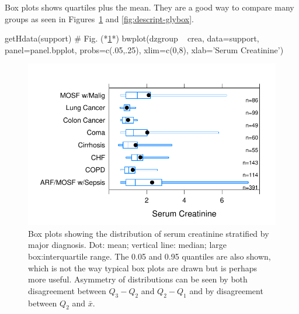 \item Box plots shows quartiles plus the mean.  They are a good way to
  compare many groups as seen in Figures~\ref{fig:descript-bwplot} and
  \ref{fig:descript-glybox}. 
\begin{Schunk}
\begin{Sinput}
getHdata(support)   # Fig. (*\ref{fig:descript-bwplot}*)
bwplot(dzgroup ~ crea, data=support, panel=panel.bpplot,
       probs=c(.05,.25), xlim=c(0,8), xlab='Serum Creatinine')
\end{Sinput}
\begin{figure}[htbp]

\centerline{\includegraphics[width=\maxwidth]{descript-bwplot-1} }

\caption[Box plots with 0.05 and 0.95 quantiles]{Box plots showing the distribution of serum creatinine  stratified by major diagnosis.  Dot: mean; vertical line: median; large box:interquartile range.  The 0.05 and 0.95 quantiles are also shown, which is not the way typical box plots are drawn but is perhaps more useful.  Asymmetry of distributions can be seen by both disagreement between $Q_{3}-Q_{2}$ and $Q_{2}-Q_{1}$ and by disagreement between $Q_{2}$ and $\bar{x}$.}\label{fig:descript-bwplot}
\end{figure}
\end{Schunk}

